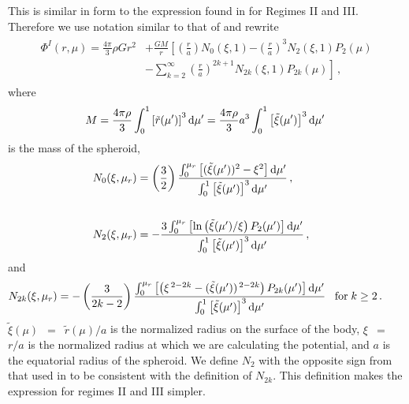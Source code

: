 \documentclass[11pt, oneside]{article}   	%
\begin{document}
%
This is similar in form to the expression found in \cite{Kong2013} for Regimes II and III. 
Therefore we use notation similar to that of \cite{Kong2013} and rewrite
%
\begin{align}
\begin{aligned}
\Phi^I(r,\mu) = \frac{4\pi}{3} \rho G r^2  {} & + \frac{G M}{r} \left [ \left ( \frac{r}{a} \right ) N_0(\xi, 1) \right. \left. -  \left ( \frac{r}{a} \right )^3 N_2(\xi,1) P_2(\mu) \right . \\
& \left . - \sum_{k=2}^{\infty}  \left ( \frac{r}{a} \right )^{2k+1} N_{2k}(\xi,1) P_{2k}(\mu) \right ] \,,
\end{aligned}
\end{align}
%
where
%
\begin{align}
\begin{aligned}
\label{HUG:eqn:1lay_M} 
M= \frac{4 \pi \rho}{3}  \int_{0}^{1} \left [ \tilde{r}(\mu') \right ]^3 {\rm d}\mu'  = \frac{4 \pi \rho}{3} a^3  \int_{0}^{1} \left [ \tilde{\xi}(\mu') \right ]^3 {\rm d}\mu' \,
\end{aligned}
\end{align}
%
is the mass of the spheroid,
%
\begin{align}
& \begin{aligned}
\label{HUG:eqn:1lay_N0}
N_0(\xi,\mu_r)  {} &=  \left (  \frac{3}{2} \right ) \frac{ \int_{0}^{\mu_r} \left [ (\tilde{\xi}(\mu'))^2 - \xi^2 \right ] {\rm d}\mu' }{\int_{0}^{1} \left [ \tilde{\xi}(\mu') \right ]^3 {\rm d}\mu' } \,, 
\end{aligned} \\[4ex]
%
& \begin{aligned}
\label{HUG:eqn:1lay_N1}
N_2(\xi,\mu_r) {} &= - \frac{ 3 \int_{0}^{\mu_r} \left [ \ln \left ( \tilde{\xi}(\mu') / \xi \right ) P_2(\mu') \right ] {\rm d}\mu' }{\int_{0}^{1} \left [ \tilde{\xi}(\mu') \right ]^3 {\rm d}\mu' } \,,
\end{aligned}
\end{align}
%
and
%
\begin{align}
& \begin{aligned}
\label{HUG:eqn:1lay_N2k}
N_{2k}(\xi,\mu_r) {} & =  -\left ( \frac{3}{2k-2} \right )  \frac{ \int_{0}^{\mu_r} \left [ \left ( \xi^{\, 2-2k} - (\tilde{\xi}(\mu'))^{\, 2-2k} \right ) P_{2k}(\mu') \right ] {\rm d}\mu' }{\int_{0}^{1} \left [ \tilde{\xi}(\mu') \right ]^3 {\rm d}\mu' }  \;\;\;   \textrm{for} \; k \ge 2 \,.
\end{aligned}
\end{align}
%
$\tilde{\xi}(\mu)$~$=$~$\tilde{r}(\mu)/a$ is the normalized radius on the surface of the body, $\xi$~$=$~$r/a$ is the normalized radius at which we are calculating the potential, and $a$ is the equatorial radius of the spheroid. We define $N_2$ with the opposite sign from that used in \cite{Kong2013} to be consistent with the definition of $N_{2k}$. This definition makes the expression for regimes II and III simpler.
\end{document}
